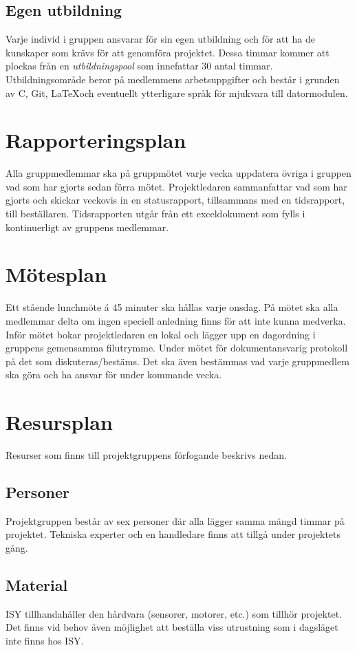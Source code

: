 \documentclass[11pt]{article}
\begin{document}
\begin{flushleft}
\subsection{Egen utbildning}
Varje individ i gruppen ansvarar för sin egen utbildning och för att ha de kunskaper som krävs för att genomföra projektet. Dessa timmar kommer att plockas från en \textit{utbildningspool} som innefattar 30 antal timmar. Utbildningsområde beror på medlemmens arbetsuppgifter och består i grunden av C, Git, \LaTeX och eventuellt ytterligare språk för mjukvara till datormodulen.

\section{Rapporteringsplan}
Alla gruppmedlemmar ska på gruppmötet varje vecka uppdatera övriga i gruppen vad som har gjorts sedan förra mötet. Projektledaren sammanfattar vad som har gjorts och skickar veckovis in en statusrapport, tillsammans med en tidsrapport, till beställaren. Tidsrapporten utgår från ett exceldokument som fylls i kontinuerligt av gruppens medlemmar.

\section{Mötesplan}
Ett stående lunchmöte á 45 minuter ska hållas varje onsdag. På mötet ska alla medlemmar delta om ingen speciell anledning finns för att inte kunna medverka. Inför mötet bokar projektledaren en lokal och lägger upp en dagordning i gruppens gemensamma filutrymme. Under mötet för dokumentansvarig protokoll på det som diskuteras/bestäms. Det ska även bestämmas vad varje gruppmedlem ska göra och ha ansvar för under kommande vecka.

\pagebreak
\section{Resursplan}
Resurser som finns till projektgruppens förfogande beskrivs nedan.
\subsection{Personer}
Projektgruppen består av sex personer där alla lägger samma mängd timmar på projektet. Tekniska experter och en handledare finns att tillgå under projektets gång.

\subsection{Material}
ISY tillhandahåller den hårdvara (sensorer, motorer, etc.) som tillhör projektet. Det finns vid behov även möjlighet att beställa viss utrustning som i dagsläget inte finns hos ISY. 


\end{flushleft}
\end{document}
